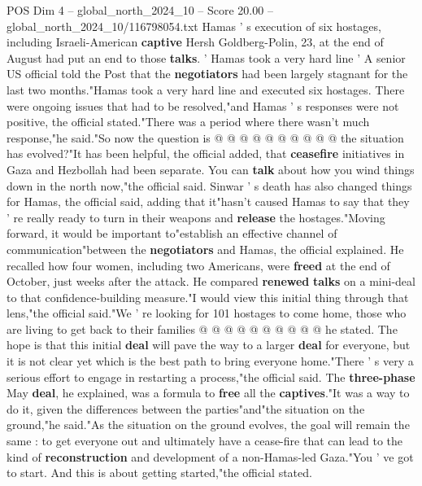 \begin{textsample}{POS Dim 4 – global\_north\_2024\_10 – Score 20.00 – global\_north\_2024\_10/116798054.txt}
Hamas ' s execution of six hostages, including Israeli-American \textbf{captive} Hersh Goldberg-Polin, 23, at the end of August had put an end to those \textbf{talks}. ' Hamas took a very hard line ' A senior US official told the Post that the \textbf{negotiators} had been largely stagnant for the last two months."Hamas took a very hard line and executed six hostages.
There were ongoing issues that had to be resolved,"and Hamas ' s responses were not positive, the official stated."There was a period where there wasn't much response,"he said."So now the question is @ @ @ @ @ @ @ @ @ @ the situation has evolved?"It has been helpful, the official added, that \textbf{ceasefire} initiatives in Gaza and Hezbollah had been separate.
You can \textbf{talk} about how you wind things down in the north now,"the official said.
Sinwar ' s death has also changed things for Hamas, the official said, adding that it"hasn't caused Hamas to say that they ' re really ready to turn in their weapons and \textbf{release} the hostages."Moving forward, it would be important to"establish an effective channel of communication"between the \textbf{negotiators} and Hamas, the official explained.
He recalled how four women, including two Americans, were \textbf{freed} at the end of October, just weeks after the attack.
He compared \textbf{renewed} \textbf{talks} on a mini-deal to that confidence-building measure."I would view this initial thing through that lens,"the official said."We ' re looking for 101 hostages to come home, those who are living to get back to their families @ @ @ @ @ @ @ @ @ @ he stated.
The hope is that this initial \textbf{deal} will pave the way to a larger \textbf{deal} for everyone, but it is not clear yet which is the best path to bring everyone home."There ' s very a serious effort to engage in restarting a process,"the official said.
The \textbf{three-phase} May \textbf{deal}, he explained, was a formula to \textbf{free} all the \textbf{captives}."It was a way to do it, given the differences between the parties"and"the situation on the ground,"he said."As the situation on the ground evolves, the goal will remain the same : to get everyone out and ultimately have a cease-fire that can lead to the kind of \textbf{reconstruction} and development of a non-Hamas-led Gaza."You ' ve got to start.
And this is about getting started,"the official stated.

\end{textsample}
